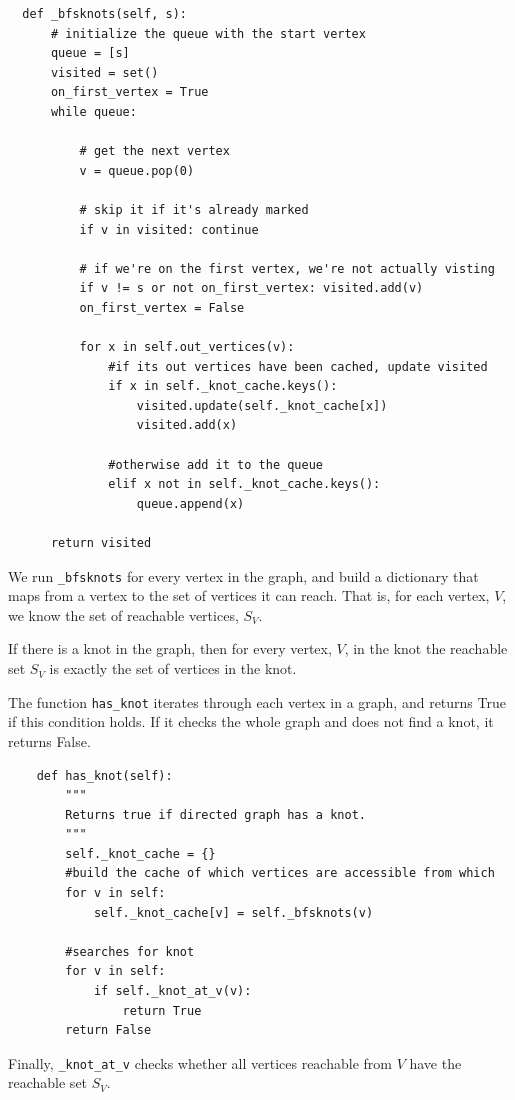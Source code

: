 \documentclass[10pt]{book}
\begin{document}
\begin{verbatim}
  def _bfsknots(self, s):
      # initialize the queue with the start vertex
      queue = [s]
      visited = set()
      on_first_vertex = True
      while queue:

          # get the next vertex
          v = queue.pop(0)

          # skip it if it's already marked
          if v in visited: continue

          # if we're on the first vertex, we're not actually visting
          if v != s or not on_first_vertex: visited.add(v)
          on_first_vertex = False
            
          for x in self.out_vertices(v):
              #if its out vertices have been cached, update visited
              if x in self._knot_cache.keys():
                  visited.update(self._knot_cache[x])
                  visited.add(x)
                    
              #otherwise add it to the queue
              elif x not in self._knot_cache.keys():
                  queue.append(x)

      return visited
\end{verbatim}

We run \verb"_bfsknots" for every vertex in
the graph, and build a dictionary that maps from a vertex to the
set of vertices it can reach.  That is, for each vertex, $V$, we
know the set of reachable vertices, $S_V$.

If there is a knot in the graph, then for every vertex, $V$, in the
knot the reachable set $S_V$ is exactly the set of vertices in the knot.

The function \verb"has_knot" iterates through each vertex in a graph,
and returns True if this condition holds. If
it checks the whole graph and does not find a knot, it returns False.

\begin{verbatim}
    def has_knot(self):
        """
        Returns true if directed graph has a knot.
        """
        self._knot_cache = {}
        #build the cache of which vertices are accessible from which
        for v in self:
            self._knot_cache[v] = self._bfsknots(v)

        #searches for knot
        for v in self:
            if self._knot_at_v(v):
                return True
        return False
\end{verbatim}

Finally, \verb"_knot_at_v" checks whether all vertices reachable
from $V$ have the reachable set $S_V$.
\end{document}
